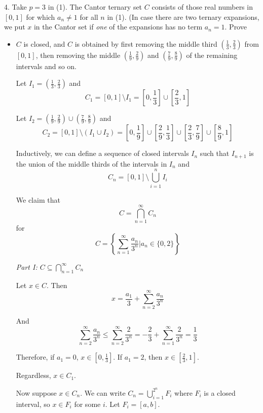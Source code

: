\documentclass[12pt]{article}
\newcommand{\sub}{\subseteq}
\begin{document}
    \color{black}

\pagebreak

4. Take $p = 3$ in (1). The Cantor ternary set $C$ consists of those real numbers in $[0, 1]$ for which $a_n \neq 1$ for all $n$ in (1). (In case there are two ternary expansions, we put $x$ in the Cantor set if \emph{one} of the expansions has no term $a_n = 1$. Prove 
\begin{itemize}
    \item $C$ is closed, and $C$ is obtained by first removing the middle third $(\frac{1}{3}, \frac{2}{3})$ from $[0, 1]$, then removing the middle $(\frac{1}{9}, \frac{2}{9})$ and $(\frac{7}{9}, \frac{8}{9})$ of the remaining intervals and so on.
    
        \color{blue}
            Let $I_1 = (\frac{1}{3}, \frac{2}{3})$ and 
            \[C_1 = [0, 1] \setminus I_1 = [0, \frac{1}{3}] \cup [\frac{2}{3}, 1]\]

            Let $I_2 = (\frac{1}{9}, \frac{2}{9}) \cup (\frac{7}{9}, \frac{8}{9})$ and
            \[C_2 = [0, 1] \setminus (I_1 \cup I_2) = [0, \frac{1}{9}] \cup [\frac{2}{9}, \frac{1}{3}] \cup [\frac{2}{3}, \frac{7}{9}] \cup [\frac{8}{9}, 1]\]

            Inductively, we can define a sequence of closed intervals $I_n$ such that $I_{n+1}$ is the union of the middle thirds of the intervals in $I_n$ and 
            \[C_n = [0, 1] \setminus \bigcup_{i=1}^n I_i\]

            We claim that 
            \[C = \bigcap_{n=1}^{\infty} C_n\]
            for
            \[C = \left\{\sum_{n=1}^{\infty} \frac{a_n}{3^n} \bigg\vert a_n \in \{0, 2\} \right\}\] 

            \emph{Part I: $C \sub \bigcap_{n=1}^{\infty} C_n$}
            
            Let $x \in C$. Then  
            \[x = \frac{a_1}{3} + \sum_{n=2}^{\infty} \frac{a_n}{3^n}\]

            And 
            \[\sum_{n=2}^{\infty} \frac{a_n}{3^n} \leq \sum_{n=2}^{\infty} \frac{2}{3^n} =  -\frac{2}{3} + \sum_{n=1}^{\infty} \frac{2}{3^n} = \frac{1}{3}\]

            Therefore, if $a_1 = 0$, $x \in [0, \frac{1}{3}]$. If $a_1 = 2$, then $x \in [\frac{2}{3}, 1]$.
            
            Regardless, $x \in C_1$. 

            Now suppose $x \in C_n$. We can write $C_n = \bigcup_{i=1}^{2^n} F_i$ where $F_i$ is a closed interval, so $x \in F_i$ for some $i$. Let $F_i = [a, b]$. 


\end{itemize}
\end{document}
